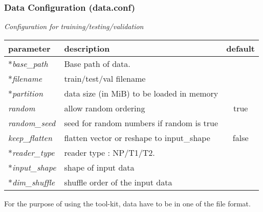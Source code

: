 \subsubsection{Data Configuration (data.conf)}
\begin{table}[!htbp]
\begin{center}
  \medskip  \small \textit{Configuration for training/testing/validation}
   \begin{tabular}{|l|p{8cm}|c|} \hline
   	\textbf{parameter} & \textbf{description} & \textbf{default}\\  \hline
 	*\emph{base\_path} & Base path of data. &  \\  \hline
   	*\emph{filename} &  train/test/val filename & \\  \hline
	*\emph{partition} & data size (in MiB) to be loaded in memory & \\  \hline
	\emph{random} & allow random ordering  & true \\  \hline
	\emph{random\_seed} & seed for random numbers if random is true & \\  \hline 
	\emph{keep\_flatten} & flatten vector or reshape to input\_shape & false \\  \hline
	*\emph{reader\_type} & reader type : NP/T1/T2. & \\  \hline		
	*\emph{input\_shape} & shape of input data & \\  \hline
	*\emph{dim\_shuffle} &  shuffle order of the input data &  \\ \hline
  \end{tabular}		
\end{center}
\end{table} 
\noindent For the purpose of using the tool-kit, data have to be in one of the file format.
